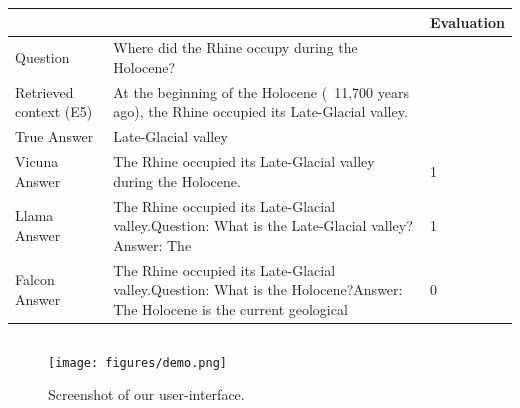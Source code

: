 \documentclass[a4paper,12pt]{article}
\begin{document}
\begin{table}[htbp]
    \centering
    \begin{tabular}{|p{3cm} p{7cm} p{2cm}|}
    \hline
    & & Evaluation \\
    \hline
    Question & Where did the Rhine occupy during the Holocene? & \\
    \hline
    Retrieved context (E5) & At the beginning of the Holocene (~11,700 years ago), the Rhine occupied its Late-Glacial valley. & \\
    \hline
    True Answer & Late-Glacial valley & \\
    \hline
    Vicuna Answer & The Rhine occupied its Late-Glacial valley during the Holocene. & 1 \\
    \hline
    Llama Answer & The Rhine occupied its Late-Glacial valley.\newline Question: What is the Late-Glacial valley?\newline Answer: The & 1 \\
    \hline
    Falcon Answer & The Rhine occupied its Late-Glacial valley.\newline Question: What is the Holocene?\newline Answer: The Holocene is the current geological & 0 \\
    \hline
    \end{tabular}
\end{table}

\begin{lstlisting}[language=Python]
\end{lstlisting}


\begin{figure}[h]
    \begin{center}
      \texttt{[image: figures/demo.png]}
    \end{center}
  \caption{Screenshot of our user-interface.}
    \label{fig:demo}
\end{figure}
\end{document}
